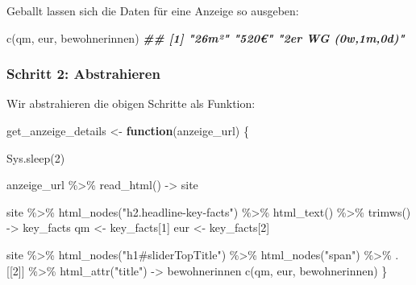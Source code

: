 \documentclass[
  ngerman,
]{article}
\newenvironment{Shaded}{\begin{snugshade}}{\end{snugshade}}
\newcommand{\ControlFlowTok}[1]{\textcolor[rgb]{0.13,0.29,0.53}{\textbf{#1}}}
\newcommand{\DecValTok}[1]{\textcolor[rgb]{0.00,0.00,0.81}{#1}}
\newcommand{\DocumentationTok}[1]{\textcolor[rgb]{0.56,0.35,0.01}{\textbf{\textit{#1}}}}
\newcommand{\FunctionTok}[1]{\textcolor[rgb]{0.00,0.00,0.00}{#1}}
\newcommand{\NormalTok}[1]{#1}
\newcommand{\OtherTok}[1]{\textcolor[rgb]{0.56,0.35,0.01}{#1}}
\newcommand{\SpecialCharTok}[1]{\textcolor[rgb]{0.00,0.00,0.00}{#1}}
\newcommand{\StringTok}[1]{\textcolor[rgb]{0.31,0.60,0.02}{#1}}
\begin{document}
Geballt lassen sich die Daten für eine Anzeige so ausgeben:

\begin{Shaded}
\begin{Highlighting}[]
\FunctionTok{c}\NormalTok{(qm, eur, bewohnerinnen)}
\DocumentationTok{\#\# [1] "26m²"              "520€"              "2er WG (0w,1m,0d)"}
\end{Highlighting}
\end{Shaded}

\hypertarget{schritt-2-abstrahieren-1}{%
\subsubsection{Schritt 2: Abstrahieren}\label{schritt-2-abstrahieren-1}}

Wir abstrahieren die obigen Schritte als Funktion:

\begin{Shaded}
\begin{Highlighting}[]
\NormalTok{get\_anzeige\_details }\OtherTok{\textless{}{-}} \ControlFlowTok{function}\NormalTok{(anzeige\_url) \{}

  \FunctionTok{Sys.sleep}\NormalTok{(}\DecValTok{2}\NormalTok{)}

\NormalTok{  anzeige\_url }\SpecialCharTok{\%\textgreater{}\%}
    \FunctionTok{read\_html}\NormalTok{() }\OtherTok{{-}\textgreater{}}\NormalTok{ site}

\NormalTok{  site }\SpecialCharTok{\%\textgreater{}\%}
    \FunctionTok{html\_nodes}\NormalTok{(}\StringTok{"h2.headline{-}key{-}facts"}\NormalTok{) }\SpecialCharTok{\%\textgreater{}\%}
    \FunctionTok{html\_text}\NormalTok{() }\SpecialCharTok{\%\textgreater{}\%}
    \FunctionTok{trimws}\NormalTok{() }\OtherTok{{-}\textgreater{}}\NormalTok{ key\_facts}
\NormalTok{    qm }\OtherTok{\textless{}{-}}\NormalTok{ key\_facts[}\DecValTok{1}\NormalTok{]}
\NormalTok{    eur }\OtherTok{\textless{}{-}}\NormalTok{ key\_facts[}\DecValTok{2}\NormalTok{]}

\NormalTok{  site }\SpecialCharTok{\%\textgreater{}\%}
    \FunctionTok{html\_nodes}\NormalTok{(}\StringTok{"h1\#sliderTopTitle"}\NormalTok{) }\SpecialCharTok{\%\textgreater{}\%}
    \FunctionTok{html\_nodes}\NormalTok{(}\StringTok{"span"}\NormalTok{) }\SpecialCharTok{\%\textgreater{}\%}
\NormalTok{    .[[}\DecValTok{2}\NormalTok{]] }\SpecialCharTok{\%\textgreater{}\%}
    \FunctionTok{html\_attr}\NormalTok{(}\StringTok{"title"}\NormalTok{) }\OtherTok{{-}\textgreater{}}\NormalTok{ bewohnerinnen}
  \FunctionTok{c}\NormalTok{(qm, eur, bewohnerinnen)}
\NormalTok{\}}
\end{Highlighting}
\end{Shaded}
\end{document}
